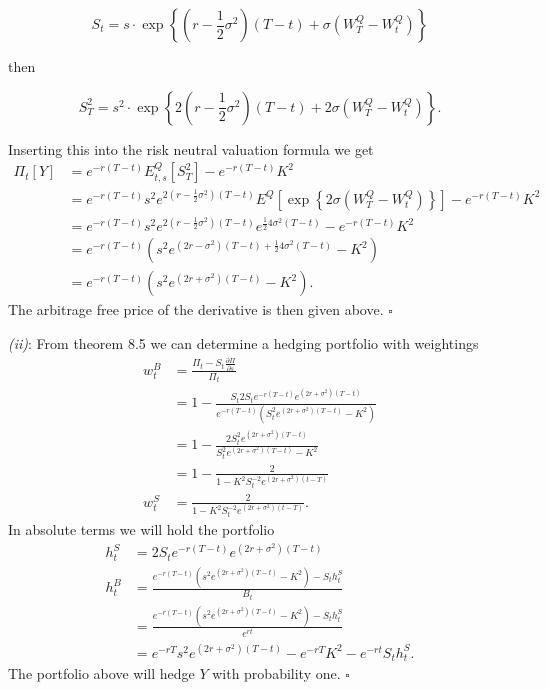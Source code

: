 \documentclass[a4paper,12pt,openany]{book}
\begin{document}
\[
S_t=s\cdot \exp\left\{\left(r-\frac{1}{2}\sigma^2\right)(T-t)+\sigma\left(W_T^Q-W_t^Q\right)\right\}
\]

then

\[
S_T^2=s^2\cdot \exp\left\{2\left(r-\frac{1}{2}\sigma^2\right)(T-t)+2\sigma\left(W_T^Q-W_t^Q\right)\right\}.
\]

Inserting this into the risk neutral valuation formula we get
\begin{align*}
\Pi_t[Y]&=e^{-r(T-t)}E^Q_{t,s}[S_T^2]-e^{-r(T-t)}K^2\\
&=e^{-r(T-t)}s^2e^{2\left(r-\frac{1}{2}\sigma^2\right)(T-t)} E^Q\left[\exp\left\{2\sigma\left(W_T^Q-W_t^Q\right)\right\}\right]-e^{-r(T-t)}K^2\\
&=e^{-r(T-t)}s^2e^{2\left(r-\frac{1}{2}\sigma^2\right)(T-t)}e^{\frac{1}{2}4\sigma^2(T-t)}-e^{-r(T-t)}K^2\\
&=e^{-r(T-t)}\left(s^2e^{(2r-\sigma^2)(T-t)+\frac{1}{2}4\sigma^2(T-t)}-K^2\right)\\
&=e^{-r(T-t)}\left(s^2e^{(2r+\sigma^2)(T-t)}-K^2\right).
\end{align*}
The arbitrage free price of the derivative is then given above. \(\square\)

\emph{(ii)}: From theorem 8.5 we can determine a hedging portfolio with weightings
\begin{align*}
w_t^B&=\frac{\Pi_t-S_t\frac{\partial\Pi}{\partial s}}{\Pi_t}\\
&=1-\frac{S_t2S_te^{-r(T-t)}e^{(2r+\sigma^2)(T-t)}}{e^{-r(T-t)}\left(S_t^2e^{(2r+\sigma^2)(T-t)}-K^2\right)}\\
&=1-\frac{2S_t^2e^{(2r+\sigma^2)(T-t)}}{S_t^2e^{(2r+\sigma^2)(T-t)}-K^2}\\
&=1-\frac{2}{1-K^2S_t^{-2}e^{(2r+\sigma^2)(t-T)}}\\
w_t^S&=\frac{2}{1-K^2S_t^{-2}e^{(2r+\sigma^2)(t-T)}}.
\end{align*}
In absolute terms we will hold the portfolio
\begin{align*}
h_t^S&=2S_te^{-r(T-t)}e^{(2r+\sigma^2)(T-t)}\\
h_t^B&=\frac{e^{-r(T-t)}\left(s^2e^{(2r+\sigma^2)(T-t)}-K^2\right)-S_th_t^S}{B_t}\\
&=\frac{e^{-r(T-t)}\left(s^2e^{(2r+\sigma^2)(T-t)}-K^2\right)-S_th_t^S}{e^{rt}}\\
&=e^{-rT}s^2e^{(2r+\sigma^2)(T-t)}-e^{-rT}K^2-e^{-rt}S_th_t^S.
\end{align*}
The portfolio above will hedge \(Y\) with probability one. \(\square\)
\end{document}
